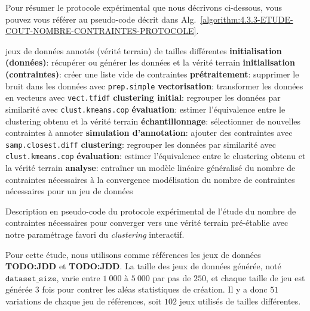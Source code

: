			Pour résumer le protocole expérimental que nous décrivons ci-dessous, vous pouvez vous référer au pseudo-code décrit dans Alg.~\ref{algorithm:4.3.3-ETUDE-COUT-NOMBRE-CONTRAINTES-PROTOCOLE}.
			\begin{algorithm}[!htb]
				\begin{algorithmic}[1]
					\Require jeux de données annotés (vérité terrain) de tailles différentes
						\State \textbf{initialisation (données)}: récupérer ou générer les données et la vérité terrain
						\State \textbf{initialisation (contraintes)}: créer une liste vide de contraintes
						\State \textbf{prétraitement}: supprimer le bruit dans les données avec \texttt{prep.simple}
						\State \textbf{vectorisation}: transformer les données en vecteurs avec \texttt{vect.tfidf}
						\State \textbf{clustering initial}: regrouper les données par similarité avec \texttt{clust.kmeans.cop}
						\State \textbf{évaluation}: estimer l'équivalence entre le clustering obtenu et la vérité terrain
						\Repeat
							\State \textbf{échantillonnage}: sélectionner de nouvelles contraintes à annoter
							\State \textbf{simulation d'annotation}: ajouter des contraintes avec \texttt{samp.closest.diff}
							\State \textbf{clustering}: regrouper les données par similarité avec \texttt{clust.kmeans.cop}
							\State \textbf{évaluation}: estimer l'équivalence entre le clustering obtenu et la vérité terrain
					\EndFor						
					\State \textbf{analyse}: entraîner un modèle linéaire généralisé du nombre de contraintes nécessaires à la convergence
					\Ensure modélisation du nombre de contraintes nécessaires pour un jeu de données
				\end{algorithmic}
				\caption{Description en pseudo-code du protocole expérimental de l'étude du nombre de contraintes nécessaires pour converger vers une vérité terrain pré-établie avec notre paramétrage favori du \textit{clustering} interactif.}
				\label{algorithm:4.3.3-ETUDE-COUT-NOMBRE-CONTRAINTES-PROTOCOLE}
			\end{algorithm}
			
			Pour cette étude, nous utilisons comme références les jeux de données \textbf{TODO:JDD} et \textbf{TODO:JDD}.
			La taille des jeux de données générée, noté $\texttt{dataset\_size}$, varie entre $1~000$ à $5~000$ par pas de $250$, et chaque taille de jeu est générée $3$ fois pour contrer les aléas statistiques de création.
			Il y a donc $51$ variations de chaque jeu de références, soit $102$ jeux utilisés de tailles différentes.
			
